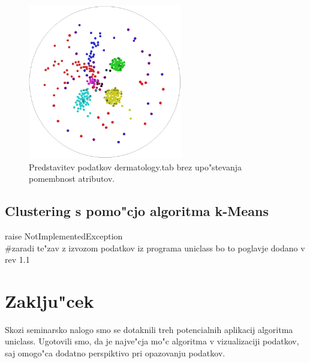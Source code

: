 \documentclass[a4paper]{article}
\begin{document}
	\begin{figure}[H]
	\begin{center}
	\includegraphics[width=0.6\textwidth]{img/der_uniclass_2.png}
	\end{center}
	\caption{Predstavitev podatkov dermatology.tab brez upo"stevanja pomembnost atributov.}
	\label{f-der-2}
	\end{figure}

	\subsection{Clustering s pomo"cjo algoritma k-Means}
		raise NotImplementedException\\
		\#zaradi te"zav z izvozom podatkov iz programa uniclass bo to poglavje dodano v rev 1.1

\section{Zaklju"cek}
	Skozi seminarsko nalogo smo se dotaknili treh potencialnih aplikacij algoritma uniclass. Ugotovili smo, da je najve"cja mo"c algoritma v vizualizaciji podatkov, saj omogo"ca dodatno perspiktivo pri opazovanju podatkov. 
	
\end{document}
